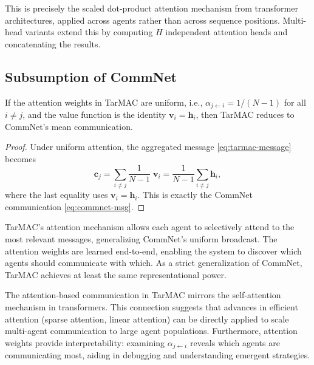 \documentclass[11pt,a4paper]{article}
\begin{document}
This is precisely the scaled dot-product attention mechanism
from transformer architectures, applied across agents rather
than across sequence positions.  Multi-head variants extend this
by computing $H$ independent attention heads and concatenating
the results.

\subsection{Subsumption of CommNet}

\begin{proposition}
\label{prop:tarmac-subsumes}
If the attention weights in TarMAC are uniform, i.e.,
$\alpha_{j \leftarrow i} = 1/(N-1)$ for all $i \neq j$, and
the value function is the identity $\mathbf{v}_i =
\mathbf{h}_i$, then TarMAC reduces to CommNet's mean
communication.
\end{proposition}

\begin{proof}
Under uniform attention, the aggregated message
\eqref{eq:tarmac-message} becomes
\[
  \mathbf{c}_j = \sum_{i \neq j} \frac{1}{N-1} \;\mathbf{v}_i
  = \frac{1}{N-1} \sum_{i \neq j} \mathbf{h}_i,
\]
where the last equality uses $\mathbf{v}_i = \mathbf{h}_i$.
This is exactly the CommNet communication
\eqref{eq:commnet-msg}.
\end{proof}

\begin{keyresult}[title={Attention-Based Targeted Communication}]
TarMAC's attention mechanism allows each agent to selectively
attend to the most relevant messages, generalizing CommNet's
uniform broadcast.  The attention weights are learned end-to-end,
enabling the system to discover which agents should communicate
with which.  As a strict generalization of CommNet, TarMAC
achieves at least the same representational power.
\end{keyresult}

\begin{rlconnection}[title={Attention and Scalability}]
The attention-based communication in TarMAC mirrors the
self-attention mechanism in transformers.  This connection
suggests that advances in efficient attention (sparse attention,
linear attention) can be directly applied to scale multi-agent
communication to large agent populations.  Furthermore,
attention weights provide interpretability: examining
$\alpha_{j \leftarrow i}$ reveals which agents are communicating
most, aiding in debugging and understanding emergent strategies.
\end{rlconnection}
\end{document}

